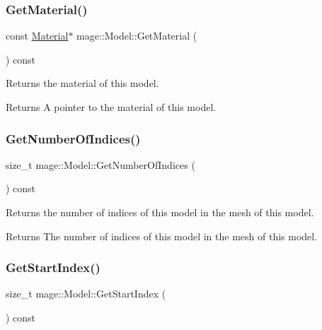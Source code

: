 \subsubsection{\texorpdfstring{Get\+Material()}{GetMaterial()}\hspace{0.1cm}{\footnotesize\ttfamily [2/2]}}
{\footnotesize\ttfamily const \hyperlink{classmage_1_1_material}{Material}$\ast$ mage\+::\+Model\+::\+Get\+Material (\begin{DoxyParamCaption}{ }\end{DoxyParamCaption}) const\hspace{0.3cm}{\ttfamily [noexcept]}}

Returns the material of this model.

\begin{DoxyReturn}{Returns}
A pointer to the material of this model. 
\end{DoxyReturn}
\hypertarget{classmage_1_1_model_a37c9814a445159fd742bcc1b9a5a7b94}{}\label{classmage_1_1_model_a37c9814a445159fd742bcc1b9a5a7b94} 
\subsubsection{\texorpdfstring{Get\+Number\+Of\+Indices()}{GetNumberOfIndices()}}
{\footnotesize\ttfamily size\+\_\+t mage\+::\+Model\+::\+Get\+Number\+Of\+Indices (\begin{DoxyParamCaption}{ }\end{DoxyParamCaption}) const\hspace{0.3cm}{\ttfamily [noexcept]}}

Returns the number of indices of this model in the mesh of this model.

\begin{DoxyReturn}{Returns}
The number of indices of this model in the mesh of this model. 
\end{DoxyReturn}
\hypertarget{classmage_1_1_model_a876fcfe369f12e2d7edb6b533dd06252}{}\label{classmage_1_1_model_a876fcfe369f12e2d7edb6b533dd06252} 
\subsubsection{\texorpdfstring{Get\+Start\+Index()}{GetStartIndex()}}
{\footnotesize\ttfamily size\+\_\+t mage\+::\+Model\+::\+Get\+Start\+Index (\begin{DoxyParamCaption}{ }\end{DoxyParamCaption}) const\hspace{0.3cm}{\ttfamily [noexcept]}}

